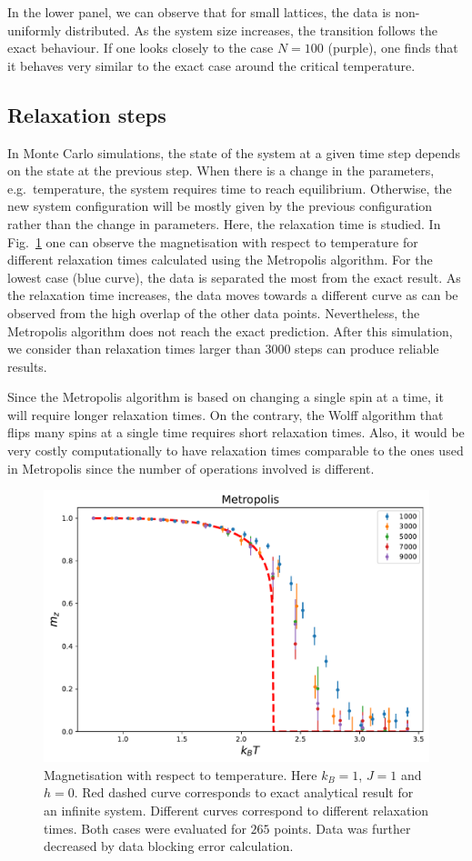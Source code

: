 \documentclass[pra,aps,superscriptaddress,amssymb,amsmath,reprint,noeprint,floatfix]{revtex4-2}
\begin{document}
In the lower panel, we can observe that for small lattices, the data is non-uniformly distributed. As the system size increases, the transition follows the exact behaviour. If one looks closely to the case $N=100$ (purple), one finds that it behaves very similar to the exact case around the critical temperature. 

\subsection{\label{subsec:relaxationsteps}Relaxation steps}
In Monte Carlo simulations, the state of the system at a given time step depends on the state at the previous step. When there is a change in the parameters, e.g.\ temperature, the system requires time to reach equilibrium. Otherwise, the new system configuration will be mostly given by the previous configuration rather than the change in parameters. Here, the relaxation time is studied. In Fig.\ \ref{fig:relax_dep} one can observe the magnetisation with respect to temperature for different relaxation times calculated using the Metropolis algorithm. For the lowest case (blue curve), the data is separated the most from the exact result. As the relaxation time increases, the data moves towards a different curve as can be observed from the high overlap of the other data points. Nevertheless, the Metropolis algorithm does not reach the exact prediction. After this simulation, we consider than relaxation times larger than 3000 steps can produce reliable results.

Since the Metropolis algorithm is based on changing a single spin at a time, it will require longer relaxation times. On the contrary, the Wolff algorithm that flips many spins at a single time requires short relaxation times. Also, it would be very costly computationally to have relaxation times comparable to the ones used in Metropolis since the number of operations involved is different. 
\begin{figure}[H]
    \centering
    \includegraphics[width=0.8\linewidth]{Figures/metropolis_relax_dependence.pdf}
    \caption{Magnetisation with respect to temperature. Here $k_B=1$, $J=1$ and $h=0$. Red dashed curve corresponds to exact analytical result for an infinite system. Different curves correspond to different relaxation times. Both cases were evaluated for $265$ points. Data was further decreased by data blocking error calculation.}
    \label{fig:relax_dep}
\end{figure}
\end{document}
